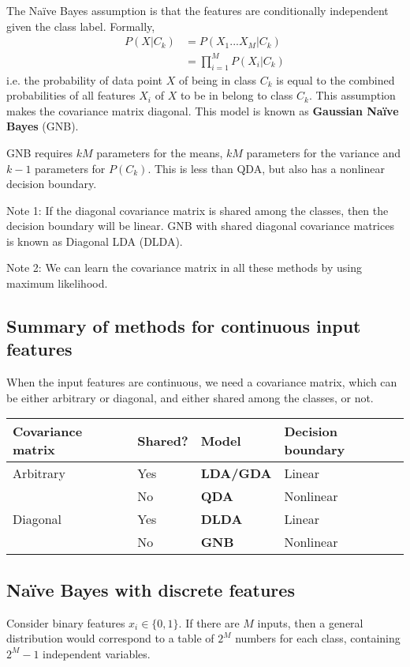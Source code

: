 \documentclass[a4paper,12pt]{article}
\begin{document}
The Naïve Bayes assumption is that the features are conditionally independent given the class label. Formally, 
\begin{align*}
P(X|C_k) &= P(X_1...X_M | C_k) \\
		 &= \prod_{i=1}^M P(X_i | C_k)
\end{align*}
i.e. the probability of data point $X$ of being in class $C_k$ is equal to the combined probabilities of all features $X_i$ of $X$ to be in belong to class $C_k$. This assumption makes the covariance matrix diagonal. This model is known as \textbf{Gaussian Naïve Bayes} (GNB). 

GNB requires $kM$ parameters for the means, $kM$ parameters for the variance and $k-1$ parameters for $P(C_k)$. This is less than QDA, but also has a nonlinear decision boundary. 

Note 1: If the diagonal covariance matrix is shared among the classes, then the decision boundary will be linear. GNB with shared diagonal covariance matrices is known as Diagonal LDA (DLDA). 

Note 2: We can learn the covariance matrix in all these methods by using maximum likelihood. 

\subsection{Summary of methods for continuous input features}

When the input features are continuous, we need a covariance matrix, which can be either arbitrary or diagonal, and either shared among the classes, or not. 

\begin{tabular}{l|l|l|l}
Covariance matrix & Shared? & Model & Decision boundary \\
\hline
Arbitrary & Yes & \textbf{LDA/GDA} & Linear \\
  		  & No  & \textbf{QDA} & Nonlinear \\
Diagonal  & Yes & \textbf{DLDA} & Linear \\
		  & No  & \textbf{GNB} & Nonlinear 
\end{tabular}


\subsection{Naïve Bayes with discrete features}

Consider binary features $x_i \in \{0, 1\}$. If there are $M$ inputs, then a general distribution would correspond to a table of $2^M$ numbers for each class, containing $2^M - 1$ independent variables. 
\end{document}
